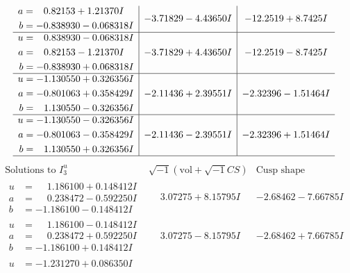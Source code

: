 \documentclass[1p]{elsarticle_modified}
\theoremstyle{definition}
\newcommand{\I}{\sqrt{-1}}
\begin{document}
$$\begin{array}{c|c|c}
\begin{aligned}
a &= \phantom{-}0.82153 + 1.21370 I \\
b &= -0.838930 - 0.068318 I\end{aligned}
 & -3.71829 - 4.43650 I & -12.2519 + 8.7425 I \\ \hline\begin{aligned}
u &= \phantom{-}0.838930 - 0.068318 I \\
a &= \phantom{-}0.82153 - 1.21370 I \\
b &= -0.838930 + 0.068318 I\end{aligned}
 & -3.71829 + 4.43650 I & -12.2519 - 8.7425 I \\ \hline\begin{aligned}
u &= -1.130550 + 0.326356 I \\
a &= -0.801063 + 0.358429 I \\
b &= \phantom{-}1.130550 - 0.326356 I\end{aligned}
 & -2.11436 + 2.39551 I & -2.32396 - 1.51464 I \\ \hline\begin{aligned}
u &= -1.130550 - 0.326356 I \\
a &= -0.801063 - 0.358429 I \\
b &= \phantom{-}1.130550 + 0.326356 I\end{aligned}
 & -2.11436 - 2.39551 I & -2.32396 + 1.51464 I\\
 \hline 
 \end{array}$$\newpage$$\begin{array}{c|c|c}  
\text{Solutions to }I^u_{3}& \I (\text{vol} + \sqrt{-1}CS) & \text{Cusp shape}\\
 \hline 
\begin{aligned}
u &= \phantom{-}1.186100 + 0.148412 I \\
a &= \phantom{-}0.238472 - 0.592250 I \\
b &= -1.186100 - 0.148412 I\end{aligned}
 & \phantom{-}3.07275 + 8.15795 I & -2.68462 - 7.66785 I \\ \hline\begin{aligned}
u &= \phantom{-}1.186100 - 0.148412 I \\
a &= \phantom{-}0.238472 + 0.592250 I \\
b &= -1.186100 + 0.148412 I\end{aligned}
 & \phantom{-}3.07275 - 8.15795 I & -2.68462 + 7.66785 I \\ \hline\begin{aligned}
u &= -1.231270 + 0.086350 I \\

\end{aligned}
\end{array}$$
\end{document}
